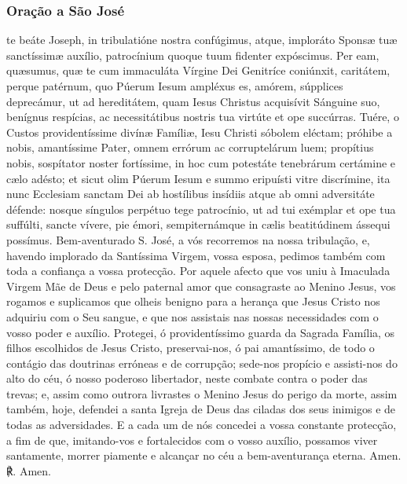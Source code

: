 \subsubsection{Oração a São José}
\begin{paracol}{2}
 te beáte Joseph, in tribulatióne nostra confúgimus, atque, imploráto Sponsæ tuæ sanctíssimæ auxílio, patrocínium quoque tuum fidenter expóscimus. Per eam, quæsumus, quæ te cum immaculáta Vírgine Dei Genitríce coniúnxit, caritátem, perque patérnum, quo Púerum Iesum ampléxus es, amórem, súpplices deprecámur, ut ad hereditátem, quam Iesus Christus acquisívit Sánguine suo, benígnus respícias, ac necessitátibus nostris tua virtúte et ope succúrras. Tuére, o Custos providentíssime divínæ Famíliæ, Iesu Christi sóbolem eléctam; próhibe a nobis, amantíssime Pater, omnem errórum ac corruptelárum luem; propítius nobis, sospítator noster fortíssime, in hoc cum potestáte tenebrárum certámine e cælo adésto; et sicut olim Púerum Iesum e summo eripuísti vitre discrímine, ita nunc Ecclesiam sanctam Dei ab hostílibus insídiis atque ab omni adversitáte défende: nosque síngulos perpétuo tege patrocínio, ut ad tui exémplar et ope tua suffúlti, sancte vívere, pie émori, sempiternámque in cælis beatitúdinem ássequi possímus.
\switchcolumn
{} Bem-aventurado S. José, a vós recorremos na nossa tribulação, e, havendo implorado da Santíssima Virgem, vossa esposa, pedimos também com toda a confiança a vossa protecção. Por aquele afecto que vos uniu à Imaculada Virgem Mãe de Deus e pelo paternal amor que consagraste ao Menino Jesus, vos rogamos e suplicamos que olheis benigno para a herança que Jesus Cristo nos adquiriu com o Seu sangue, e que nos assistais nas nossas necessidades com o vosso poder e auxílio. Protegei, ó providentíssimo guarda da Sagrada Família, os filhos escolhidos de Jesus Cristo, preservai-nos, ó pai amantíssimo, de todo o contágio das doutrinas erróneas e de corrupção; sede-nos propício e assisti-nos do alto do céu, ó nosso poderoso libertador, neste combate contra o poder das trevas; e, assim como outrora livrastes o Menino Jesus do perigo da morte, assim também, hoje, defendei a santa Igreja de Deus das ciladas dos seus inimigos e de todas as adversidades. E a cada um de nós concedei a vossa constante protecção, a fim de que, imitando-vos e fortalecidos com o vosso auxílio, possamos viver santamente, morrer piamente e alcançar no céu a bem-aventurança eterna.
 Amen.
\switchcolumn
{\redx ℟.} Amen.
\end{paracol}

